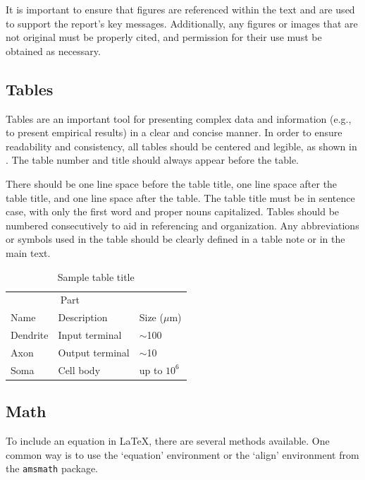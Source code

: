 \documentclass{article}
\begin{document}
It is important to ensure that figures are referenced within the text and are used to support the report's key messages. Additionally, any figures or images that are not original must be properly cited, and permission for their use must be obtained as necessary.


\subsection{Tables}



Tables are an important tool for presenting complex data and information (e.g., to present empirical results) in a clear and concise manner. In order to ensure readability and consistency, all tables should be centered and legible, as shown in . The table number and title should always appear before the table.

There should be one line space before the table title, one line space after the table title, and one line space after the table. The table title must be in sentence case, with only the first word and proper nouns capitalized. Tables should be numbered consecutively to aid in referencing and organization.
%
Any abbreviations or symbols used in the table should be clearly defined in a table note or in the main text. 


\begin{table}[h]
  \caption{Sample table title}
  \label{sample-table}
  \centering
  \begin{tabular}{lll}
    \toprule
    \multicolumn{2}{c}{Part}                   \\
    \cmidrule(r){1-2}
    Name     & Description     & Size ($\mu$m) \\
    \midrule
    Dendrite & Input terminal  & $\sim$100     \\
    Axon     & Output terminal & $\sim$10      \\
    Soma     & Cell body       & up to $10^6$  \\
    \bottomrule
  \end{tabular}
\end{table}



\subsection{Math}



To include an equation in LaTeX, there are several methods available. One common way is to use the `equation' environment or the `align' environment from the \texttt{amsmath} package.
\end{document}
